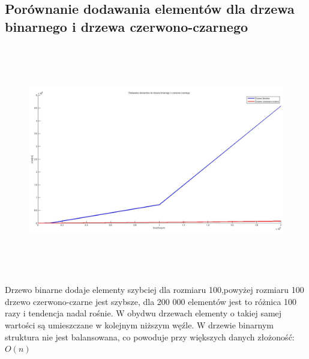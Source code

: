 \documentclass[a4paper,11pt]{article}
\begin{document}
\subsection{Porównanie dodawania elementów dla drzewa binarnego i drzewa czerwono-czarnego}
\begin{center}
\begin{figure}[h!]
\includegraphics[width=12.5cm,height=10cm]{Wykresy2/DodawanieElementow}
\label{fig:obrazek Wykresy2/DodawanieElementow}
\end{figure}
\end{center}
Drzewo binarne dodaje elementy szybciej dla rozmiaru 100,powyżej rozmiaru 100 drzewo czerwono-czarne jest szybsze, dla 200 000 elementów jest to różnica 100 razy i tendencja nadal rośnie. W obydwu drzewach elementy o takiej samej wartości są umieszczane w kolejnym niższym węźle. W drzewie binarnym struktura nie jest balansowana, co powoduje przy większych danych złożoność:
$O(n) 
$ 
\newpage
\end{document}
